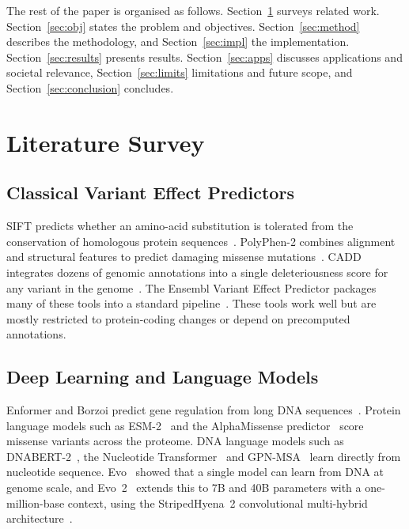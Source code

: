 \documentclass[conference,a4paper]{IEEEtran}
\begin{document}
The rest of the paper is organised as follows. Section~\ref{sec:lit} surveys related work. Section~\ref{sec:obj} states the problem and objectives. Section~\ref{sec:method} describes the methodology, and Section~\ref{sec:impl} the implementation. Section~\ref{sec:results} presents results. Section~\ref{sec:apps} discusses applications and societal relevance, Section~\ref{sec:limits} limitations and future scope, and Section~\ref{sec:conclusion} concludes.

\section{Literature Survey}
\label{sec:lit}

\subsection{Classical Variant Effect Predictors}
SIFT predicts whether an amino-acid substitution is tolerated from the conservation of homologous protein sequences~\cite{ng2001sift}. PolyPhen-2 combines alignment and structural features to predict damaging missense mutations~\cite{adzhubei2010polyphen2}. CADD integrates dozens of genomic annotations into a single deleteriousness score for any variant in the genome~\cite{rentzsch2019cadd,schubach2024cadd}. The Ensembl Variant Effect Predictor packages many of these tools into a standard pipeline~\cite{mclaren2016vep}. These tools work well but are mostly restricted to protein-coding changes or depend on precomputed annotations.

\subsection{Deep Learning and Language Models}
Enformer and Borzoi predict gene regulation from long DNA sequences~\cite{avsec2021enformer,linder2025borzoi}. Protein language models such as ESM-2~\cite{lin2023esm2} and the AlphaMissense predictor~\cite{cheng2023alphamissense} score missense variants across the proteome. DNA language models such as DNABERT-2~\cite{zhou2024dnabert2}, the Nucleotide Transformer~\cite{dallatorre2024nt} and GPN-MSA~\cite{benegas2025gpnmsa} learn directly from nucleotide sequence. Evo~\cite{nguyen2024evo} showed that a single model can learn from DNA at genome scale, and Evo~2~\cite{brixi2026evo2} extends this to 7B and 40B parameters with a one-million-base context, using the StripedHyena~2 convolutional multi-hybrid architecture~\cite{brixi2025stripedhyena2}.
\end{document}
